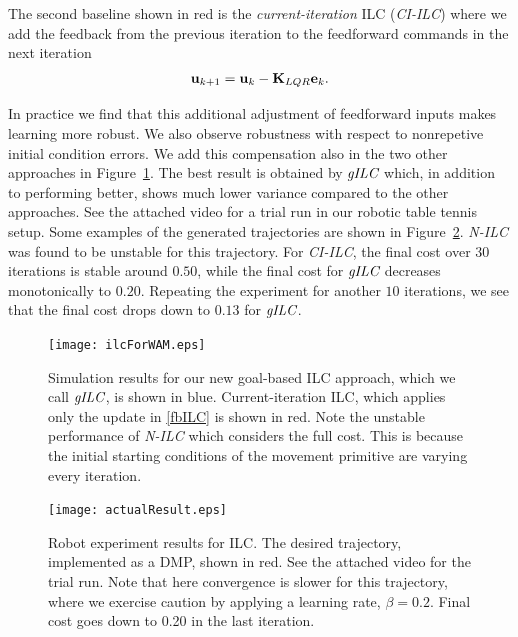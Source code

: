 The second baseline shown in red is the \emph{current-iteration} ILC (\emph{CI-ILC}) where we add the feedback from the previous iteration to the feedforward commands in the next iteration
%
\begin{equation}
\begin{aligned}
\boldsymbol{\mathrm{u}}_{k+1} &= \boldsymbol{\mathrm{u}}_k - \boldsymbol{\mathrm{K}}_{LQR}\boldsymbol{\mathrm{e}}_{k}.\\
\end{aligned}
\label{fbILC}
\end{equation}
%

\noindent In practice we find that this additional adjustment of feedforward inputs makes learning more robust. We also observe robustness with respect to nonrepetive initial condition errors. We add this compensation also in the two other approaches in Figure~\ref{ILCTrajectoryTT}. The best result is obtained by $\emph{gILC}$ which, in addition to performing better, shows much lower variance compared to the other approaches. See the attached video for a trial run in our robotic table tennis setup. Some examples of the generated trajectories are shown in Figure~\ref{actualResultWAM}. \emph{N-ILC} was found to be unstable for this trajectory. For \emph{CI-ILC}, the final cost over $30$ iterations is stable around $0.50$, while the final cost for $\emph{gILC}$ decreases monotonically to $0.20$. Repeating the experiment for another $10$ iterations, we see that the final cost drops down to $0.13$ for $\emph{gILC}$.


\begin{figure}
\center
\texttt{[image: ilcForWAM.eps]}
\caption{Simulation results for our new goal-based ILC approach, which we call $\emph{gILC}$, is shown in blue. Current-iteration ILC, which applies only the update in \eqref{fbILC} is shown in red. Note the unstable performance of \emph{N-ILC} which considers the full cost. This is because the initial starting conditions of the movement primitive are varying every iteration.}
\label{ILCTrajectoryTT}
\end{figure}

\begin{figure}
\center
\texttt{[image: actualResult.eps]}
\caption{Robot experiment results for ILC. The desired trajectory, implemented as a DMP, shown in red. See the attached video for the trial run. Note that here convergence is slower for this trajectory, where we exercise caution by applying a learning rate, $\beta = 0.2$. Final cost goes down to 0.20 in the last iteration.}
\label{actualResultWAM}
\end{figure}